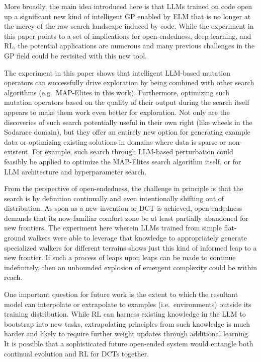 \documentclass{article}
\begin{document}
More broadly, the main idea introduced here is that LLMs trained on code open up a significant new kind of intelligent GP enabled by ELM that is no longer at the mercy of the raw search landscape induced by code.  While the experiment in this paper points to a set of implications for open-endedness, deep learning, and RL, the potential applications are numerous and many previous challenges in the GP field could be revisited with this new tool.     

The experiment in this paper shows that intelligent LLM-based mutation operators 
can successfully drive exploration by being combined with other search algorithms (e.g.\ MAP-Elites in this work). Furthermore, optimizing such mutation operators based on the quality of their output during the search itself appears to make them work even better for exploration.
Not only are the discoveries of such search potentially useful in their own right (like wheels in the Sodarace domain), but they offer an entirely new option for generating example data or optimizing existing solutions in domains where data is sparse or non-existent. For example, such search through LLM-based perturbation could feasibly be applied to optimize the MAP-Elites search algorithm itself, or for LLM architecture and hyperparameter search.

From the perspective of open-endedness, the challenge in principle is that the search is by definition continually and even intentionally shifting out of distribution.  As soon as a new invention or DCT is achieved, open-endedness demands that its now-familiar comfort zone be at least partially abandoned for new frontiers. The experiment here wherein LLMs trained from simple flat-ground walkers were able to leverage that knowledge to appropriately generate specialized walkers for different terrains shows just this kind of informed leap to a new frontier.  If such a process of leaps upon leaps can be made to continue indefinitely, then an unbounded explosion of emergent complexity could be within reach.

One important question for future work is the extent to which the resultant model can interpolate or extrapolate to examples (i.e.\ environments) outside its training distribution. 
While RL can harness existing knowledge in the LLM to bootstrap into new tasks, extrapolating principles from such knowledge is much harder and likely to require further weight updates through additional learning.  It is possible that a sophisticated future open-ended system would entangle both continual evolution and RL for DCTs together.
\end{document}

